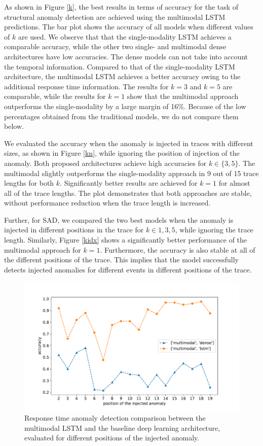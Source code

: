 As shown in Figure \ref{k}, the best results in terms of accuracy for the task of structural anomaly detection are achieved using the multimodal LSTM predictions. The bar plot shows the accuracy of all models when different values of $k$ are used. We observe that that the single-modality LSTM achieves a comparable accuracy, while the other two single- and multimodal dense architectures have low accuracies. The dense models can not take into account the temporal information. Compared to that of the single-modality LSTM architecture, the multimodal LSTM achieves a better accuracy owing to the additional response time information. The results for $k=3$ and $k=5$ are comparable, while the results for $k=1$ show that the multimodal approach outperforms the single-modality by a large margin of 16\%. Because of the low percentages obtained from the traditional models, we do not compare them below. 

We evaluated the accuracy when the anomaly is injected in traces with different sizes, as shown in Figure \ref{kn}, while ignoring the position of injection of the anomaly. Both proposed architectures achieve high accuracies for $k \in \{3,5\}$. The multimodal slightly outperforms the single-modality approach in 9 out of 15 trace lengths for both $k$. Significantly better results are achieved for $k=1$ for almost all of the trace lengths. The plot demonstrates that both approaches are stable, without performance reduction when the trace length is increased.

Further, for SAD, we compared the two best models when the anomaly is injected in different positions in the trace for $k \in {1,3,5}$, while ignoring the trace length. Similarly, Figure \ref{kidx} shows a significantly better performance of the multimodal approach for $k=1$. Furthermore, the accuracy is also stable at all of the different positions of the trace. This implies that the model successfully detects injected anomalies for different events in different positions of the trace.

\begin{figure}[htbp]
\centerline{\includegraphics[width=1.0\textwidth]{gfx/chap5/rtidx.pdf}}
\caption{Response time anomaly detection comparison between the multimodal LSTM and the baseline deep learning architecture, evaluated for different positions of the injected anomaly.}
\label{rtidx}
\end{figure}


